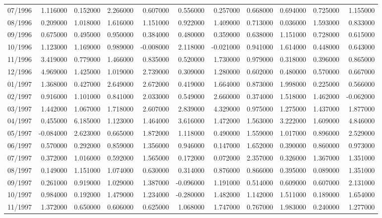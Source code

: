 \begin{tabular}{lrrrrrrrrrr}
07/1996 & 1.116000 & 0.152000 & 2.266000 & 0.607000 & 0.556000 & 0.257000 & 0.668000 & 0.694000 & 0.725000 & 1.155000 \\
08/1996 & 0.209000 & 1.018000 & 1.616000 & 1.151000 & 0.922000 & 1.409000 & 0.713000 & 0.036000 & 1.593000 & 0.833000 \\
09/1996 & 0.675000 & 0.495000 & 0.950000 & 0.384000 & 0.480000 & 0.359000 & 0.638000 & 1.151000 & 0.728000 & 0.615000 \\
10/1996 & 1.123000 & 1.169000 & 0.989000 & -0.008000 & 2.118000 & -0.021000 & 0.941000 & 1.614000 & 0.448000 & 0.643000 \\
11/1996 & 3.419000 & 0.779000 & 1.466000 & 0.835000 & 0.520000 & 1.730000 & 0.979000 & 0.318000 & 0.396000 & 0.865000 \\
12/1996 & 4.969000 & 1.425000 & 1.019000 & 2.739000 & 0.309000 & 1.280000 & 0.602000 & 0.480000 & 0.570000 & 0.667000 \\
01/1997 & 1.368000 & 0.427000 & 2.649000 & 2.672000 & 0.419000 & 1.664000 & 0.873000 & 1.998000 & 0.225000 & 0.566000 \\
02/1997 & 0.916000 & 1.101000 & 0.841000 & 2.033000 & 0.549000 & 2.660000 & 0.374000 & 1.518000 & 1.462000 & -0.062000 \\
03/1997 & 1.442000 & 1.067000 & 1.718000 & 2.607000 & 2.839000 & 4.329000 & 0.975000 & 1.275000 & 1.437000 & 1.877000 \\
04/1997 & 0.455000 & 6.185000 & 1.123000 & 1.464000 & 3.616000 & 1.472000 & 1.563000 & 3.222000 & 1.609000 & 4.846000 \\
05/1997 & -0.084000 & 2.623000 & 0.665000 & 1.872000 & 1.118000 & 0.490000 & 1.559000 & 1.017000 & 0.896000 & 2.529000 \\
06/1997 & 0.570000 & 0.292000 & 0.859000 & 1.356000 & 0.946000 & 0.147000 & 1.652000 & 0.390000 & 0.860000 & 0.973000 \\
07/1997 & 0.372000 & 1.016000 & 0.592000 & 1.565000 & 0.172000 & 0.072000 & 2.357000 & 0.326000 & 1.367000 & 1.351000 \\
08/1997 & 0.149000 & 1.151000 & 1.074000 & 0.630000 & 0.314000 & 0.876000 & 0.866000 & 0.395000 & 0.089000 & 1.351000 \\
09/1997 & 0.261000 & 0.919000 & 1.029000 & 1.387000 & -0.096000 & 1.191000 & 0.514000 & 0.609000 & 0.607000 & 2.131000 \\
10/1997 & 0.984000 & 0.192000 & 1.479000 & 1.234000 & -0.280000 & 1.482000 & 1.142000 & 1.511000 & 0.189000 & 1.654000 \\
11/1997 & 1.372000 & 0.650000 & 0.606000 & 0.625000 & 1.068000 & 1.747000 & 0.767000 & 1.983000 & 0.240000 & 1.277000 \\

\end{tabular}

